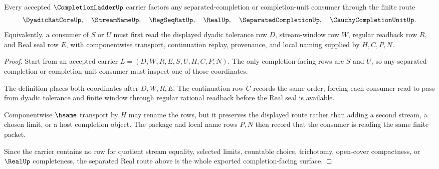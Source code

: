 \begin{theorem}
\label{thm:completion-ladder-separated-real-route}
Every accepted $\CompletionLadderUp$ carrier factors any separated-completion or completion-unit consumer through the finite route
$$
\DyadicRatCoreUp,\quad
\StreamNameUp,\quad
\RegSeqRatUp,\quad
\RealUp,\quad
\SeparatedCompletionUp,\quad
\CauchyCompletionUnitUp .
$$
Equivalently, a consumer of $S$ or $U$ must first read the displayed dyadic tolerance row $D$, stream-window row $W$, regular readback row $R$, and Real seal row $E$, with componentwise transport, continuation replay, provenance, and local naming supplied by $H,C,P,N$.
\end{theorem}
\begin{proof}
Start from an accepted carrier $L=(D,W,R,E,S,U,H,C,P,N)$. The only completion-facing rows are $S$ and $U$, so any separated-completion or completion-unit consumer must inspect one of those coordinates.

The definition places both coordinates after $D,W,R,E$. The continuation row $C$ records the same order, forcing each consumer read to pass from dyadic tolerance and finite window through regular rational readback before the Real seal is available.

Componentwise $\hsame$ transport by $H$ may rename the rows, but it preserves the displayed route rather than adding a second stream, a chosen limit, or a host completion object. The package and local name rows $P,N$ then record that the consumer is reading the same finite packet.

Since the carrier contains no row for quotient stream equality, selected limits, countable choice, trichotomy, open-cover compactness, or $\RealUp$ completeness, the separated Real route above is the whole exported completion-facing surface.
\end{proof}

\begin{closurestatus}{\CompletionLadderUp}
  \theoryclosure{\seedClosure}
  \formalstatus{\unformalizedV}
\end{closurestatus}
